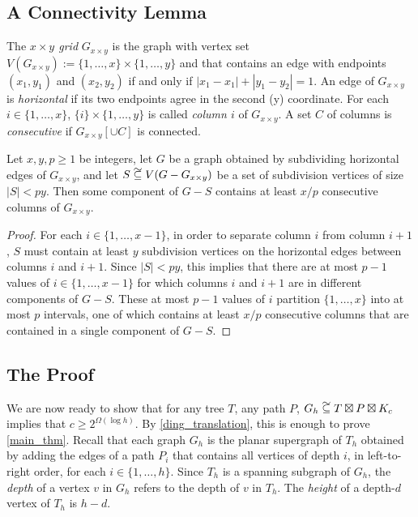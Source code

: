 \documentclass{patmorin}
\newcommand{\defin}[1]{\emph{\color{brightmaroon}#1}}
\renewcommand{\ge}{\geqslant}
\newcommand\subsetcong{\mathrel{\text{%
    \setbox0\hbox{$\subseteq$}%
    \rlap{\hbox to \wd0{\hss\hss\hss\raisebox{1.5\height}{$\sim$}\hss}}\box0
}}}
\begin{document}
\subsection{A Connectivity Lemma}

The \defin{$x\times y$ grid} $G_{x\times y}$ is the graph with vertex set $V(G_{x\times y}):=\{1,\ldots,x\}\times\{1,\ldots,y\}$ and that contains an edge with endpoints $(x_1,y_1)$ and $(x_2,y_2)$ if and only if $|x_1-x_1|+|y_1-y_2|=1$.  An edge of $G_{x\times y}$ is \defin{horizontal} if its two endpoints agree in the second (y) coordinate.  For each $i\in\{1,\ldots,x\}$, $\{i\}\times\{1,\ldots,y\}$ is called \defin{column $i$} of $G_{x\times y}$.  A set $C$ of columns is \defin{consecutive} if $G_{x\times y}[\cup C]$ is connected.


\begin{lem}\label{grid_connectivity}
  Let $x,y,p\ge 1$ be integers, let $G$ be a graph obtained by subdividing horizontal edges of $G_{x\times y}$, and let $S\subsetcong V(G-G_{x\times y})$ be a set of subdivision vertices of size $|S|< py$.  Then some component of $G-S$ contains at least $x/p$ consecutive columns of $G_{x\times y}$.
\end{lem}

\begin{proof}
  For each $i\in\{1,\ldots,x-1\}$, in order to separate column $i$ from column $i+1$, $S$ must contain at least $y$ subdivision vertices on the horizontal edges between columns $i$ and $i+1$.  Since $|S|< py$, this implies that there are at most $p-1$ values of $i\in\{1,\ldots,x-1\}$ for which columns $i$ and $i+1$ are in different components of $G-S$. These at most $p-1$ values of $i$ partition $\{1,\ldots,x\}$ into at most $p$ intervals, one of which contains at least $x/p$ consecutive columns that are contained in a single component of $G-S$.
\end{proof}

\subsection{The Proof}




We are now ready to show that for any tree $T$, any path $P$, $G_{h}\subsetcong T\boxtimes P\boxtimes K_c$ implies that $c\ge 2^{\Omega(\log h)}$.  By \cref{ding_translation}, this is enough to prove \cref{main_thm}.  Recall that each graph $G_{h}$ is the planar supergraph of $T_h$ obtained by adding the edges of a path $P_i$ that contains all vertices of depth $i$, in left-to-right order, for each $i\in\{1,\ldots,h\}$.   Since $T_h$ is a spanning subgraph of $G_h$, the \defin{depth} of a vertex $v$ in $G_h$ refers to the depth of $v$ in $T_h$.  The \defin{height} of a depth-$d$ vertex of $T_h$ is $h-d$.
\end{document}
